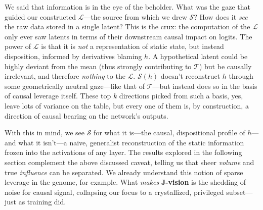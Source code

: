 \documentclass{article}
\newcommand{\jlens}{\mathscr{L}}
\newcommand{\jspace}{\mathscr{S}}
\begin{document}
We said that information is in the eye of the beholder. What was the gaze that guided our constructed \(\jlens\)---the source from which we drew \(\jspace\)? How does it \textit{see} the raw data stored in a single latent? This is the crux: the computation of the \(\jlens\) only ever saw latents in terms of their downstream causal impact on logits. The power of \(\jlens\) is that it is \textit{not} a representation of static state, but instead disposition, informed by derivatives blaming \(h\). A hypothetical latent could be highly deviant from the mean (thus strongly contributing to \(\mathscr{T}\)) but be causally irrelevant, and therefore \textit{nothing} to the \(\jlens\). \(\jspace(h)\) doesn't reconstruct \(h\) through some geometrically neutral gaze---like that of \(\mathscr{T}\)---but instead does so in the basis of causal leverage itself. These top \(k\) directions picked from such a basis, yes, leave lots of variance on the table, but every one of them is, by construction, a direction of causal bearing on the network's outputs.

With this in mind, we see \(\jspace\) for what it is---the causal, dispositional profile of \(h\)---and what it isn't---a naive, generalist reconstruction of the static information frozen into the activations of any layer. The results explored in the following section complement the above discussed caveat, telling us that sheer \textit{volume} and true \textit{influence} can be separated. We already understand this notion of sparse leverage in the genome, for example. What \textit{makes} \textbf{J-vision} is the shedding of noise for causal signal, collapsing our focus to a crystallized, privileged subset---just as training did.
\end{document}
